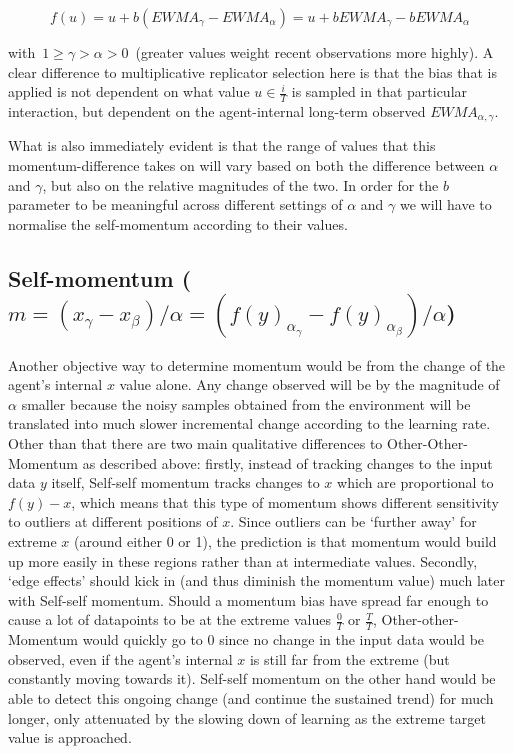 $$f(u) = u + b (EWMA_\gamma-EWMA_\alpha) = u + b EWMA_\gamma - b EWMA_\alpha$$

with~$1\ge\gamma>\alpha>0$~(greater values weight recent observations more highly). A clear difference to multiplicative replicator selection here is that the bias that is applied is not dependent on what value $u \in \frac{i}{T}$ is sampled in that particular interaction, but dependent on the agent-internal long-term observed $EWMA_{\alpha,\gamma}$.

What is also immediately evident is that the range of values that this momentum-difference takes on will vary based on both the difference between $\alpha$ and $\gamma$, but also on the relative magnitudes of the two. In order for the $b$ parameter to be meaningful across different settings of $\alpha$ and $\gamma$ we will have to normalise the self-momentum according to their values.

\subsection{Self-momentum ($m=(x_\gamma-x_\beta)/\alpha=(f(y)_{\alpha_\gamma}-f(y)_{\alpha_\beta})/\alpha$)}

Another objective way to determine momentum would be from the change of the agent's internal $x$ value alone. Any change observed will be by the magnitude of $\alpha$ smaller because the noisy samples obtained from the environment will be translated into much slower incremental change according to the learning rate. Other than that there are two main qualitative differences to Other-Other-Momentum as described above: firstly, instead of tracking changes to the input data $y$ itself, Self-self momentum tracks changes to $x$ which are proportional to $f(y)-x$, which means that this type of momentum shows different sensitivity to outliers at different positions of $x$. Since outliers can be `further away' for extreme $x$ (around either 0 or 1), the prediction is that momentum would build up more easily in these regions rather than at intermediate values. Secondly, `edge effects' should kick in (and thus diminish the momentum value) much later with Self-self momentum. Should a momentum bias have spread far enough to cause a lot of datapoints to be at the extreme values $\frac{0}{T}$ or $\frac{T}{T}$, Other-other-Momentum would quickly go to 0 since no change in the input data would be observed, even if the agent's internal $x$ is still far from the extreme (but constantly moving towards it). Self-self momentum on the other hand would be able to detect this ongoing change (and continue the sustained trend) for much longer, only attenuated by the slowing down of learning as the extreme target value is approached.

